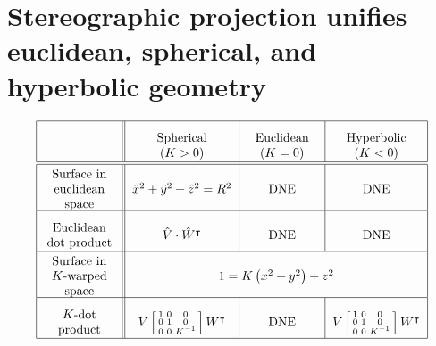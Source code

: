 \documentclass{ximera}
\begin{document}
\section{Stereographic projection unifies euclidean, spherical, and hyperbolic geometry}

\[
{\renewcommand{\arraystretch}{2.7}
  \begin{tabular}{|c||c|c|c|}\hline
    & \begin{minipage}{2cm}\begin{center}Spherical ($K>0$)\end{center}\end{minipage} & \begin{minipage}{2cm}\begin{center}Euclidean ($K=0$)\end{center}\end{minipage} & \begin{minipage}{2cm}\begin{center}Hyperbolic ($K<0$)\end{center}\end{minipage}\\\hline\hline
    \begin{minipage}{2cm}\begin{center}Surface in \\ euclidean space\end{center}\end{minipage} & $\hat{x}^{2}+\hat{y}^{2}+\hat{z}^{2}=R^{2}$ & DNE  & DNE \\\hline
    \begin{minipage}{2cm}\begin{center}Euclidean dot product\end{center}\end{minipage} & $\hat{V}\cdot \hat{W}^\transpose$ & DNE  & DNE\\\hline
     \begin{minipage}{2cm}\begin{center}Surface in $K$-warped space\end{center}\end{minipage} & \multicolumn{3}{c|}{$1=K\left(  x^{2}+y^{2}\right)  +z^{2}$}\\\hline
     \begin{minipage}{2cm}\begin{center}$K$-dot product\end{center}\end{minipage} & $V\left[\begin{smallmatrix}1 & 0 & 0\\ 0 & 1 & 0\\ 0 & 0 & K^{-1}\end{smallmatrix}\right] W^\transpose$ &  DNE & $V\left[\begin{smallmatrix}1 & 0 & 0\\ 0 & 1 & 0\\ 0 & 0 & K^{-1}\end{smallmatrix}\right]W^\transpose$\\\hline

\end{tabular}}\]
\end{document}

